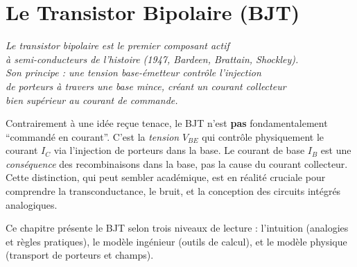 \documentclass[12pt,a4paper,twoside]{book}
\begin{document}


\chapter{Le Transistor Bipolaire (BJT)}

\begin{center}
\textit{Le transistor bipolaire est le premier composant actif\\
à semi-conducteurs de l'histoire (1947, Bardeen, Brattain, Shockley).\\
Son principe : une tension base-émetteur contrôle l'injection\\
de porteurs à travers une base mince, créant un courant collecteur\\
bien supérieur au courant de commande.}
\end{center}

\vspace{0.5cm}

Contrairement à une idée reçue tenace, le BJT n'est \textbf{pas} fondamentalement ``commandé en courant''. C'est la \textit{tension} $V_{BE}$ qui contrôle physiquement le courant $I_C$ via l'injection de porteurs dans la base. Le courant de base $I_B$ est une \textit{conséquence} des recombinaisons dans la base, pas la cause du courant collecteur. Cette distinction, qui peut sembler académique, est en réalité cruciale pour comprendre la transconductance, le bruit, et la conception des circuits intégrés analogiques.

Ce chapitre présente le BJT selon trois niveaux de lecture : l'intuition (analogies et règles pratiques), le modèle ingénieur (outils de calcul), et le modèle physique (transport de porteurs et champs).

\end{document}
